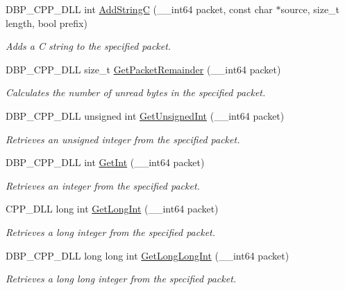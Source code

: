 \begin{DoxyCompactItemize}
DBP\_\-CPP\_\-DLL int \hyperlink{namespacemn_af0362f4b04ef52ae68a71e64a102e898}{AddStringC} (\_\-\_\-int64 packet, const char $\ast$source, size\_\-t length, bool prefix)
\begin{DoxyCompactList}\small\item\em Adds a C string to the specified packet. \item\end{DoxyCompactList}\item 
DBP\_\-CPP\_\-DLL size\_\-t \hyperlink{namespacemn_a0ef3d1df4730cc5bf008979274154b99}{GetPacketRemainder} (\_\-\_\-int64 packet)
\begin{DoxyCompactList}\small\item\em Calculates the number of unread bytes in the specified packet. \item\end{DoxyCompactList}\item 
DBP\_\-CPP\_\-DLL unsigned int \hyperlink{namespacemn_a6431cbaca9a7e390377b112050ccd688}{GetUnsignedInt} (\_\-\_\-int64 packet)
\begin{DoxyCompactList}\small\item\em Retrieves an unsigned integer from the specified packet. \item\end{DoxyCompactList}\item 
DBP\_\-CPP\_\-DLL int \hyperlink{namespacemn_af529e8b437a2d3c8d782da1ab47dbe77}{GetInt} (\_\-\_\-int64 packet)
\begin{DoxyCompactList}\small\item\em Retrieves an integer from the specified packet. \item\end{DoxyCompactList}\item 
CPP\_\-DLL long int \hyperlink{namespacemn_ab9270e6721c7a7f3753d069e9c99f679}{GetLongInt} (\_\-\_\-int64 packet)
\begin{DoxyCompactList}\small\item\em Retrieves a long integer from the specified packet. \item\end{DoxyCompactList}\item 
DBP\_\-CPP\_\-DLL long long int \hyperlink{namespacemn_a88b9312e83b83b46465a7b1f69e6451d}{GetLongLongInt} (\_\-\_\-int64 packet)
\begin{DoxyCompactList}\small\item\em Retrieves a long long integer from the specified packet. \item\end{DoxyCompactList}\item 

\end{DoxyCompactItemize}

